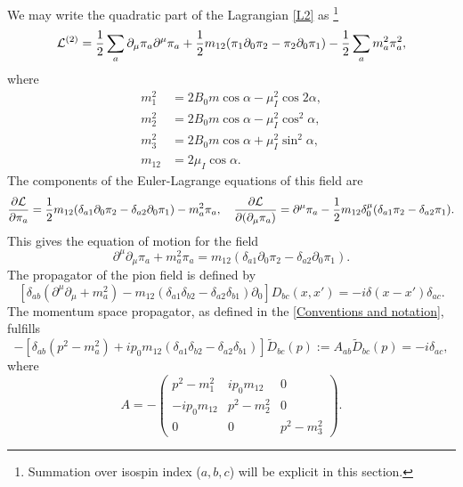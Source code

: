 We may write the quadratic part of the Lagrangian \autoref{L2} as \footnote{Summation over isospin index ($a,b,c$) will be explicit in this section.}
\begin{align}
    \mathcal{L}^{(2)}
    =
    \frac{1}{2} \sum_a \partial_\mu \pi_a \partial^\mu \pi_a
    + \frac{1}{2} m_{12} (\pi_1 \partial_0 \pi_2 - \pi_2 \partial_0 \pi_1)
    - \frac{1}{2} \sum_a m_a^2 \pi_a^2,
\end{align}
where
\begin{align}
    m_1^2 &= 2 B_0 m \cos{\alpha} - \mu_I^2 \cos{2\alpha}, \\
    m_2^2 &= 2 B_0 m \cos{\alpha} - \mu_I^2 \cos^2{\alpha}, \\
    m_3^2 &= 2 B_0 m \cos{\alpha} + \mu_I^2 \sin^2{\alpha}, \\
    m_{12} &= 2 \mu_I \cos{\alpha}.
\end{align}
The components of the Euler-Lagrange equations of this field are
\begin{equation*}
    \pdv{\mathcal{L}}{\pi_a} = 
    \frac{1}{2} m_{12} (\delta_{a1} \partial_0 \pi_2 - \delta_{a2}\partial_0 \pi_1) 
    - m^2_{a} \pi_a, \quad
    \pdv{\mathcal{L}}{(\partial_\mu \pi_a)} = 
    \partial^\mu \pi_a - \frac{1}{2} m_{12} \delta^\mu_0 (\delta_{a1}\pi_2  - \delta_{a2}\pi_1).
\end{equation*}
This gives the equation of motion for the field
\begin{equation}
    \partial^\mu \partial_\mu \pi_a + m_a^2 \pi_a
    =  m_{12}(\delta_{a1} \partial_0 \pi_2  - \delta_{a2} \partial_0 \pi_1).
\end{equation}
The propagator of the pion field is defined by
\begin{equation}
    \left[
        \delta_{ab}(\partial^\mu\partial_\mu + m^2_a)
        -  m_{12}(\delta_{a1} \delta_{b2} - \delta_{a2}\delta_{b1}) \partial_0
    \right] 
    D_{bc}(x, x') 
    = -i \delta(x - x') \delta_{ac}.
\end{equation}
The momentum space propagator, as defined in the \autoref{Conventions and notation}, fulfills
\begin{equation*}
    -\left[
        \delta_{ab}(p^2 - m_a^2)
        +  i p_0 m_{12}(\delta_{a1} \delta_{b2} - \delta_{a2}\delta_{b1}) 
    \right] 
    \tilde D_{bc}(p) 
    := A_{ab} \tilde D_{bc}(p) = -i \delta_{ac},
\end{equation*}
where
\begin{equation*}
    A = -
    \begin{pmatrix}
        p^2 - m^2_1             & i p_0 m_{12}     & 0             \\
        - i p_0 m_{12}            & p^2 - m^2_2       & 0             \\
        0                       & 0                 & p^2 - m^2_3
    \end{pmatrix}.
\end{equation*}
